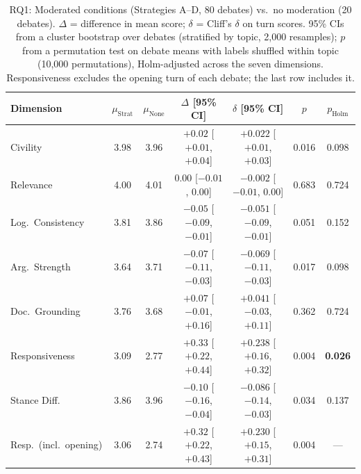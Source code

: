 \begin{table}[htbp]
\centering
\caption[RQ1: moderated conditions vs.\ no moderation]{RQ1: Moderated conditions (Strategies A--D, 80 debates) vs.\ no moderation (20 debates). $\Delta$ = difference in mean score; $\delta$ = Cliff's $\delta$ on turn scores. 95\% CIs from a cluster bootstrap over debates (stratified by topic, 2,000 resamples); $p$ from a permutation test on debate means with labels shuffled within topic (10,000 permutations), Holm-adjusted across the seven dimensions. Responsiveness excludes the opening turn of each debate; the last row includes it.}
\label{tab:rq1}
\small
\setlength{\tabcolsep}{4pt}
\begin{tabular}{l cc c c c c}
\toprule
\textbf{Dimension} & $\mu_{\text{Strat}}$ & $\mu_{\text{None}}$ & $\Delta$ [95\% CI] & $\delta$ [95\% CI] & $p$ & $p_{\text{Holm}}$ \\
\midrule
Civility & 3.98 & 3.96 & $+0.02$ [$+0.01$, $+0.04$] & $+0.022$ [$+0.01$, $+0.03$] & 0.016 & 0.098 \\
Relevance & 4.00 & 4.01 & $0.00$ [$-0.01$, $0.00$] & $-0.002$ [$-0.01$, $0.00$] & 0.683 & 0.724 \\
Log.\ Consistency & 3.81 & 3.86 & $-0.05$ [$-0.09$, $-0.01$] & $-0.051$ [$-0.09$, $-0.01$] & 0.051 & 0.152 \\
Arg.\ Strength & 3.64 & 3.71 & $-0.07$ [$-0.11$, $-0.03$] & $-0.069$ [$-0.11$, $-0.03$] & 0.017 & 0.098 \\
Doc.\ Grounding & 3.76 & 3.68 & $+0.07$ [$-0.01$, $+0.16$] & $+0.041$ [$-0.03$, $+0.11$] & 0.362 & 0.724 \\
Responsiveness & 3.09 & 2.77 & $+0.33$ [$+0.22$, $+0.44$] & $+0.238$ [$+0.16$, $+0.32$] & 0.004 & \textbf{0.026} \\
Stance Diff. & 3.86 & 3.96 & $-0.10$ [$-0.16$, $-0.04$] & $-0.086$ [$-0.14$, $-0.03$] & 0.034 & 0.137 \\
\midrule
Resp.\ (incl.\ opening) & 3.06 & 2.74 & $+0.32$ [$+0.22$, $+0.43$] & $+0.230$ [$+0.15$, $+0.31$] & 0.004 & --- \\
\bottomrule
\end{tabular}
\end{table}